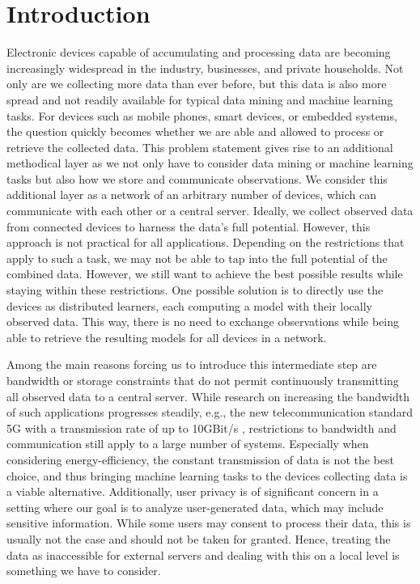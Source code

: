\chapter{Introduction}
Electronic devices capable of accumulating and processing data are becoming increasingly widespread in the industry, businesses, and private households.
Not only are we collecting more data than ever before, but this data is also more spread and not readily available for typical data mining and machine learning tasks.
For devices such as mobile phones, smart devices, or embedded systems, the question quickly becomes whether we are able and allowed to process or retrieve the collected data.
This problem statement gives rise to an additional methodical layer as we not only have to consider data mining or machine learning tasks but also how we store and communicate observations.
We consider this additional layer as a network of an arbitrary number of devices, which can communicate with each other or a central server.
Ideally, we collect observed data from connected devices to harness the data's full potential.
However, this approach is not practical for all applications.
Depending on the restrictions that apply to such a task, we may not be able to tap into the full potential of the combined data.
However, we still want to achieve the best possible results while staying within these restrictions.
One possible solution is to directly use the devices as distributed learners, each computing a model with their locally observed data.
This way, there is no need to exchange observations while being able to retrieve the resulting models for all devices in a network.

Among the main reasons forcing us to introduce this intermediate step are bandwidth or storage constraints that do not permit continuously transmitting all observed data to a central server.
While research on increasing the bandwidth of such applications progresses steadily, e.g., the new telecommunication standard 5G with a transmission rate of up to 10GBit/s \cite{nordrum2017ieee}, restrictions to bandwidth and communication still apply to a large number of systems. 
Especially when considering energy-efficiency, the constant transmission of data is not the best choice, and thus bringing machine learning tasks to the devices collecting data is a viable alternative.
Additionally, user privacy is of significant concern in a setting where our goal is to analyze user-generated data, which may include sensitive information.
While some users may consent to process their data, this is usually not the case and should not be taken for granted. 
Hence, treating the data as inaccessible for external servers and dealing with this on a local level is something we have to consider.

